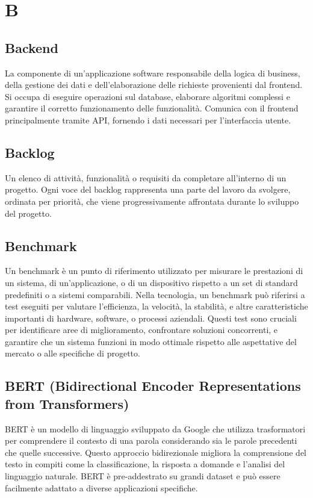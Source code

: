 \documentclass{article}
\begin{document}
\newpage
\section{B}

\subsection{Backend}
La componente di un'applicazione software responsabile della logica di business, della gestione dei dati e dell'elaborazione delle richieste provenienti dal frontend. Si occupa di eseguire operazioni sul database, elaborare algoritmi complessi e garantire il corretto funzionamento delle funzionalità. Comunica con il frontend principalmente tramite API, fornendo i dati necessari per l'interfaccia utente.

\subsection{Backlog}
Un elenco di attività, funzionalità o requisiti da completare all'interno di un progetto. Ogni voce del backlog rappresenta una parte del lavoro da svolgere, ordinata per priorità, che viene progressivamente affrontata durante lo sviluppo del progetto.
 
\subsection{Benchmark}
Un benchmark è un punto di riferimento utilizzato per misurare le prestazioni di un sistema, di un'applicazione, o di un dispositivo rispetto a un set di standard predefiniti o a sistemi comparabili. Nella tecnologia, un benchmark può riferirsi a test eseguiti per valutare l'efficienza, la velocità, la stabilità, e altre caratteristiche importanti di hardware, software, o processi aziendali. Questi test sono cruciali per identificare aree di miglioramento, confrontare soluzioni concorrenti, e garantire che un sistema funzioni in modo ottimale rispetto alle aspettative del mercato o alle specifiche di progetto.

\subsection{BERT (Bidirectional Encoder Representations from Transformers)}
BERT è un modello di linguaggio sviluppato da Google che utilizza trasformatori per comprendere il contesto di una parola considerando sia le parole precedenti che quelle successive. Questo approccio bidirezionale migliora la comprensione del testo in compiti come la classificazione, la risposta a domande e l'analisi del linguaggio naturale. BERT è pre-addestrato su grandi dataset e può essere facilmente adattato a diverse applicazioni specifiche.
\end{document}
